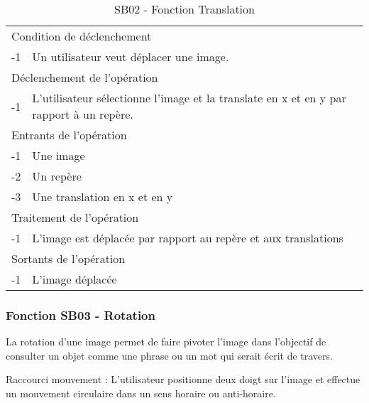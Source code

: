 \documentclass[a4paper]{article}
\begin{document}
\begin{table}[H]
  \centering
   \small
	\begin{tabular}{|c|p{12cm}|}
   		\hline
   			\rowcolor{lightgray}\multicolumn{2}{|c|}{\textbf{SB02 - Fonction Translation}} \\
   		\hline
   			\multicolumn{2}{|l|}{Condition de d\'eclenchement} \\
   		\hline
   			-1 & Un utilisateur veut déplacer une image. \\
   		\hline
   			\multicolumn{2}{|l|}{D\'eclenchement de l'op\'eration} \\
   		\hline
   			-1 & L'utilisateur sélectionne l'image et la translate en x et en y par rapport à un repère. \\
   		\hline
   			\multicolumn{2}{|l|}{Entrants de l'op\'eration} \\
   		\hline
        	-1 & Une image \\
   			-2 & Un repère \\
        	-3 & Une translation en x et en y \\ 	
        \hline
   			\multicolumn{2}{|l|}{Traitement de l'op\'eration} \\
  		\hline
   			-1 & L'image est déplacée par rapport au repère et aux translations \\
   		\hline
   			\multicolumn{2}{|l|}{Sortants de l'op\'eration} \\
   		\hline
   			-1 & L'image déplacée \\
   		\hline
	\end{tabular}
  \caption{SB02 - Fonction Translation}
  \normalsize
  \label{tab:visu_img_translation}
\end{table}

\subsubsection{Fonction SB03 - Rotation}

La rotation d'une image permet de faire pivoter l'image dans l'objectif de consulter un objet comme une phrase ou un mot qui serait écrit de travers.

Raccourci mouvement : L'utilisateur positionne deux doigt sur l'image et effectue un mouvement circulaire dans un sens horaire ou anti-horaire.
\end{document}
